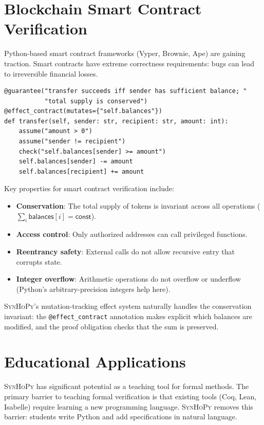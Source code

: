 \documentclass[11pt,a4paper]{report}
\theoremstyle{definition}
\theoremstyle{plain}
\newcommand{\synhopy}{\textsc{SynHoPy}}
\begin{document}
\section{Blockchain Smart Contract Verification}

Python-based smart contract frameworks (Vyper, Brownie, Ape) are gaining
traction.  Smart contracts have extreme correctness requirements: bugs
can lead to irreversible financial losses.

\begin{lstlisting}[style=synhopy]
@guarantee("transfer succeeds iff sender has sufficient balance; "
           "total supply is conserved")
@effect_contract(mutates={"self.balances"})
def transfer(self, sender: str, recipient: str, amount: int):
    assume("amount > 0")
    assume("sender != recipient")
    check("self.balances[sender] >= amount")
    self.balances[sender] -= amount
    self.balances[recipient] += amount
\end{lstlisting}

Key properties for smart contract verification include:
\begin{itemize}
  \item \textbf{Conservation}: The total supply of tokens is invariant
    across all operations ($\sum_i \mathsf{balances}[i] = \mathsf{const}$).
  \item \textbf{Access control}: Only authorized addresses can call
    privileged functions.
  \item \textbf{Reentrancy safety}: External calls do not allow recursive
    entry that corrupts state.
  \item \textbf{Integer overflow}: Arithmetic operations do not overflow
    or underflow (Python's arbitrary-precision integers help here).
\end{itemize}

\synhopy{}'s mutation-tracking effect system naturally handles the
conservation invariant: the \lstinline[style=synhopy]{@effect_contract}
annotation makes explicit which balances are modified, and the proof
obligation checks that the sum is preserved.

\section{Educational Applications}

\synhopy{} has significant potential as a teaching tool for formal methods.
The primary barrier to teaching formal verification is that existing tools
(Coq, Lean, Isabelle) require learning a new programming language.
\synhopy{} removes this barrier: students write Python and add
specifications in natural language.
\end{document}
